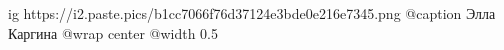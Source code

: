  
 
 
 
 

\ifcmt
  ig https://i2.paste.pics/b1cc7066f76d37124e3bde0e216e7345.png
	@caption Элла Каргина
  @wrap center
  @width 0.5
\fi
